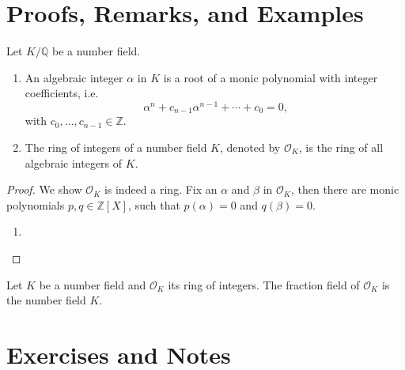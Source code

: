 \section{Proofs, Remarks, and Examples}
\begin{defbox}
    \begin{definition}
        Let \(K / \mathbb{Q}\) be a number field.
        \begin{enumerate}
            \item An algebraic integer \(\alpha\) in \(K\) is a root of a monic polynomial with integer coefficients, i.e.
            \begin{equation}
                \alpha^n + c_{n-1} \alpha^{n-1} + \cdots + c_0 = 0 \text{,}
            \end{equation}
            with \(c_{0}, \ldots, c_{n-1} \in \mathbb{Z}\).
            \item The ring of integers of a number field \(K\), denoted by \(\mathcal{O}_K\), is the ring of all algebraic integers of \(K\).
        \end{enumerate}
    \end{definition}
\end{defbox}
\begin{proof}
    We show \(\mathcal{O}_K\) is indeed a ring. Fix an \(\alpha\) and \(\beta\) in \(\mathcal{O}_K\), then there are monic polynomials \(p, q \in \mathbb{Z}[X]\), such that \(p(\alpha) = 0\) and \(q(\beta) = 0\).
    \begin{enumerate}
        \item 
    \end{enumerate}
\end{proof}
\begin{thmbox}
    \begin{corollary}
        Let \(K\) be a number field and \(\mathcal{O}_K\) its ring of integers. The fraction field of \(\mathcal{O}_K\) is the number field \(K\).
    \end{corollary}
\end{thmbox}
%
\newpage
\section{Exercises and Notes}